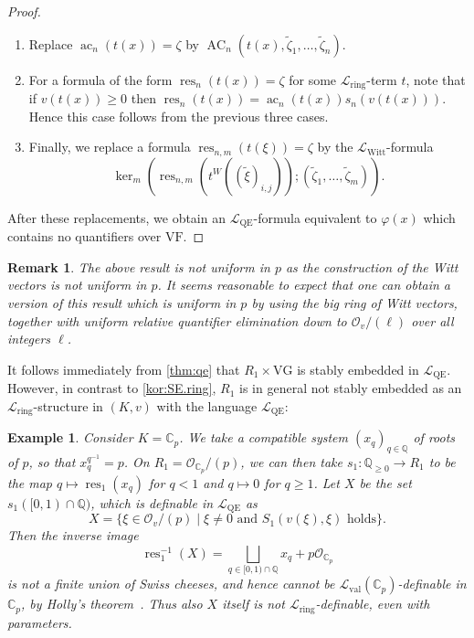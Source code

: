 \documentclass[a4paper]{amsart}
\theoremstyle{mystyle2}
\theoremstyle{mystyle}
\newtheorem{examp}[thm]{Example}
\newtheorem{rem}[thm]{Remark}
\DeclareMathOperator{\res}{res}
\DeclareMathOperator{\ac}{ac}
\newcommand{\Q}{\mathbb{Q}}
\newcommand{\bC}{\mathbb{C}}
\DeclareMathOperator{\AC}{AC}
\renewcommand{\L}{\mathcal{L}}
\newcommand{\Lring}{\L_{\mathrm{ring}}}
\newcommand{\Lval}{\L_{\mathrm{val}}}
\newcommand{\LWitt}{\L_{\mathrm{Witt}}}
\renewcommand{\O}{\mathcal{O}}
\newcommand{\LQE}{\L_\mathrm{QE}}
\newcommand{\VF}{\mathrm{VF}}
\newcommand{\VG}{\mathrm{VG}}
\numberwithin{equation}{section}
\begin{document}
\begin{proof}
\begin{enumerate}
            \item Replace $\ac_n(t(x)) = \zeta$ by $\AC_n(t(x), \tilde{\zeta}_1, \ldots, \tilde{\zeta}_n)$.
            \item For a formula of the form $\res_n(t(x)) = \zeta$ for some $\Lring$-term $t$, note that if $v(t(x))\geq 0$ then $\res_n(t(x)) = \ac_n(t(x))s_n(v(t(x)))$. Hence this case follows from the previous three cases.
            \item Finally, we replace a formula $\res_{n,m}(t(\xi)) = \zeta$ by the $\LWitt$-formula 
            \[
            \ker_m(\res_{n,m}(t^W((\tilde{\xi})_{i,j})); (\tilde{\zeta}_1, \ldots, \tilde{\zeta}_m)).
            \]
        \end{enumerate}
        After these replacements, we obtain an $\LQE$-formula equivalent to $\varphi(x)$ which contains no quantifiers over $\VF$.
    \end{proof}

    \begin{rem}
        The above result is not uniform in $p$ as the construction of the Witt vectors is not uniform in $p$.
        It seems reasonable to expect that one can obtain a version of this result which is uniform in $p$ by using the big ring of Witt vectors, together with uniform relative quantifier elimination down to $\O_v/(\ell)$ over all integers $\ell$.
    \end{rem}

    It follows immediately from \cref{thm:qe} that $R_1\times \VG$ is stably embedded in $\LQE$.
    However, in contrast to \cref{kor:SE.ring}, $R_1$ is in general not stably embedded as an $\Lring$-structure in $(K,v)$ with the language $\LQE$:
    \begin{examp}
    Consider
    $K = \bC_p$.
    We take a compatible system $(x_q)_{q\in \Q}$ of roots of $p$, so that $x_q^{q^{-1}} = p$.
    On $R_1 = \O_{\mathbb{C}_p}/(p)$, we can then take $s_1\colon \Q_{\geq 0}\to R_1$ to be the map $q\mapsto \res_1(x_q)$ for $q < 1$ and $q\mapsto 0$ for $q \geq 1$.
    Let $X$ be the set $s_1([0,1)\cap \Q)$, which is definable in $\LQE$ as 
    \[
    X = \{\xi\in \O_v/(p)\mid \xi\neq 0 \text{ and } S_1(v(\xi), \xi) \text{ holds}\}.
    \]
    Then the inverse image
    \[
    \res_1^{-1}(X) = \bigsqcup_{q\in [0,1)\cap \Q} x_q + p\O_{\bC_p}
    \]
    is not a finite union of Swiss cheeses, and hence cannot be $\Lval(\bC_p)$-definable in $\bC_p$, by Holly's theorem~\cite[Corollary 3.8]{holly}.
    Thus also $X$ itself is not $\Lring$-definable, even with parameters.
    \end{examp}
    
\end{document}
